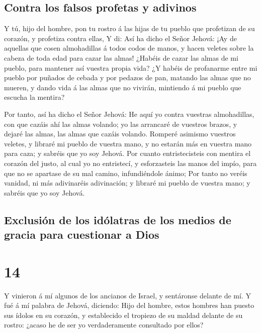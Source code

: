 \hypertarget{contra-los-falsos-profetas-y-adivinos}{%
\subsection{Contra los falsos profetas y
adivinos}\label{contra-los-falsos-profetas-y-adivinos}}

 Y tú, hijo del hombre, pon tu rostro á las hijas de tu
pueblo que profetizan de su corazón, y profetiza contra ellas,
 Y di: Así ha dicho el Señor Jehová: ¡Ay de aquellas que
cosen almohadillas á todos codos de manos, y hacen veletes sobre la
cabeza de toda edad para cazar las almas! ¿Habéis de cazar las almas de
mi pueblo, para mantener así vuestra propia vida?  ¿Y
habéis de profanarme entre mi pueblo por puñados de cebada y por pedazos
de pan, matando las almas que no mueren, y dando vida á las almas que no
vivirán, mintiendo á mi pueblo que escucha la mentira?

 Por tanto, así ha dicho el Señor Jehová: He aquí yo
contra vuestras almohadillas, con que cazáis ahí las almas volando; yo
las arrancaré de vuestros brazos, y dejaré las almas, las almas que
cazáis volando.  Romperé asimismo vuestros veletes, y
libraré mi pueblo de vuestra mano, y no estarán más en vuestra mano para
caza; y sabréis que yo soy Jehová.  Por cuanto
entristecisteis con mentira el corazón del justo, al cual yo no
entristecí, y esforzasteis las manos del impío, para que no se apartase
de su mal camino, infundiéndole ánimo;  Por tanto no
veréis vanidad, ni más adivinaréis adivinación; y libraré mi pueblo de
vuestra mano; y sabréis que yo soy Jehová.

\hypertarget{exclusiuxf3n-de-los-iduxf3latras-de-los-medios-de-gracia-para-cuestionar-a-dios}{%
\subsection{Exclusión de los idólatras de los medios de gracia para
cuestionar a
Dios}\label{exclusiuxf3n-de-los-iduxf3latras-de-los-medios-de-gracia-para-cuestionar-a-dios}}

\hypertarget{section-13}{%
\section{14}\label{section-13}}

 Y vinieron á mí algunos de los ancianos de Israel, y
sentáronse delante de mí.  Y fué á mí palabra de Jehová,
diciendo:  Hijo del hombre, estos hombres han puesto sus
ídolos en su corazón, y establecido el tropiezo de su maldad delante de
su rostro: ¿acaso he de ser yo verdaderamente consultado por ellos?

